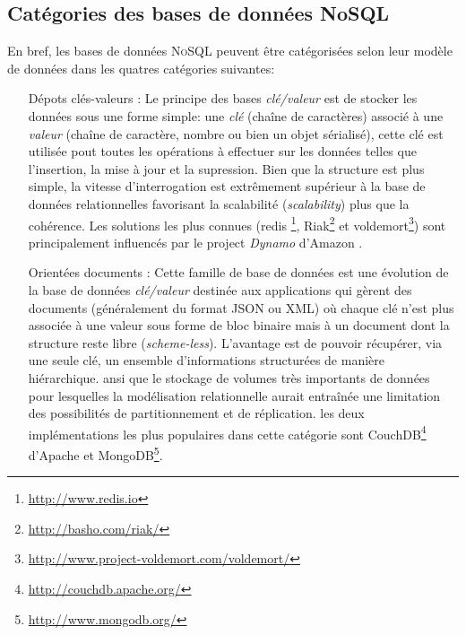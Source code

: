 \newpage
  \subsection{Catégories des bases de données NoSQL}
  \label{4nosql}
  En bref, les bases de données \textsc{NoSQL} peuvent être
  catégorisées selon leur modèle de données dans les quatres
  catégories suivantes:

  \begin{itemize}
  \item [Dépots clés-valeurs]: Le principe des bases
    \textit{clé/valeur} est de stocker les données sous une forme
    simple: une \emph{clé } (chaîne de caractères) associé à une
    \emph{valeur} (chaîne de caractère, nombre ou bien un objet
    sérialisé), cette clé est utilisée pout toutes les opérations à
    effectuer sur les données telles que l'insertion, la mise à jour
    et la supression. Bien que la structure est plus simple, la
    vitesse d'interrogation est extrêmement supérieur à la base de
    données relationnelles favorisant la scalabilité
    (\emph{scalability}) plus que la cohérence. Les solutions les plus
    connues (redis \footnote{\url{http://www.redis.io}},
    Riak\footnote{\url{http://basho.com/riak/}} et
    voldemort\footnote{\url{http://www.project-voldemort.com/voldemort/}})
    sont principalement influencés par le project \emph{Dynamo}
    d'Amazon \cite{decandia2007dynamo}.

  \item [Orientées documents]: Cette famille de base de données est
    une évolution de la base de données \textit{clé/valeur} destinée
    aux applications qui gèrent des documents (généralement du format
    \textsc{JSON} ou \textsc{XML}) où chaque clé n'est plus associée à
    une valeur sous forme de bloc binaire mais à un document dont la
    structure reste libre (\textit{scheme-less}). L'avantage est de
    pouvoir récupérer, via une seule clé, un ensemble d’informations
    structurées de manière hiérarchique. ansi que le stockage de
    volumes très importants de données pour lesquelles la modélisation
    relationnelle aurait entraînée une limitation des possibilités de
    partitionnement et de réplication. les deux implémentations les
    plus populaires dans cette catégorie sont
    CouchDB\footnote{\url{http://couchdb.apache.org/}} d'Apache et
    MongoDB\footnote{\url{http://www.mongodb.org/}}.


\end{itemize}
